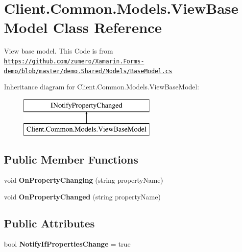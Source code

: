 \hypertarget{classClient_1_1Common_1_1Models_1_1ViewBaseModel}{}\section{Client.\+Common.\+Models.\+View\+Base\+Model Class Reference}
\label{classClient_1_1Common_1_1Models_1_1ViewBaseModel}


View base model. This Code is from \href{https://github.com/zumero/Xamarin.Forms-demo/blob/master/demo.Shared/Models/BaseModel.cs}{\tt https\+://github.\+com/zumero/\+Xamarin.\+Forms-\/demo/blob/master/demo.\+Shared/\+Models/\+Base\+Model.\+cs}  


Inheritance diagram for Client.\+Common.\+Models.\+View\+Base\+Model\+:\begin{figure}[H]
\begin{center}
\leavevmode
\includegraphics[height=2.000000cm]{classClient_1_1Common_1_1Models_1_1ViewBaseModel}
\end{center}
\end{figure}
\subsection*{Public Member Functions}
\begin{DoxyCompactItemize}
\item 
\hypertarget{classClient_1_1Common_1_1Models_1_1ViewBaseModel_a997c58390fa1515349afa15ee0f7e011}{}void {\bfseries On\+Property\+Changing} (string property\+Name)\label{classClient_1_1Common_1_1Models_1_1ViewBaseModel_a997c58390fa1515349afa15ee0f7e011}

\item 
\hypertarget{classClient_1_1Common_1_1Models_1_1ViewBaseModel_a002174135d9aa86dd16a2da9913a4282}{}void {\bfseries On\+Property\+Changed} (string property\+Name)\label{classClient_1_1Common_1_1Models_1_1ViewBaseModel_a002174135d9aa86dd16a2da9913a4282}

\end{DoxyCompactItemize}
\subsection*{Public Attributes}
\begin{DoxyCompactItemize}
\item 
\hypertarget{classClient_1_1Common_1_1Models_1_1ViewBaseModel_a297e760135ca5bbbb3c603b88404fcc5}{}bool {\bfseries Notify\+If\+Properties\+Change} = true\label{classClient_1_1Common_1_1Models_1_1ViewBaseModel_a297e760135ca5bbbb3c603b88404fcc5}

\end{DoxyCompactItemize}
